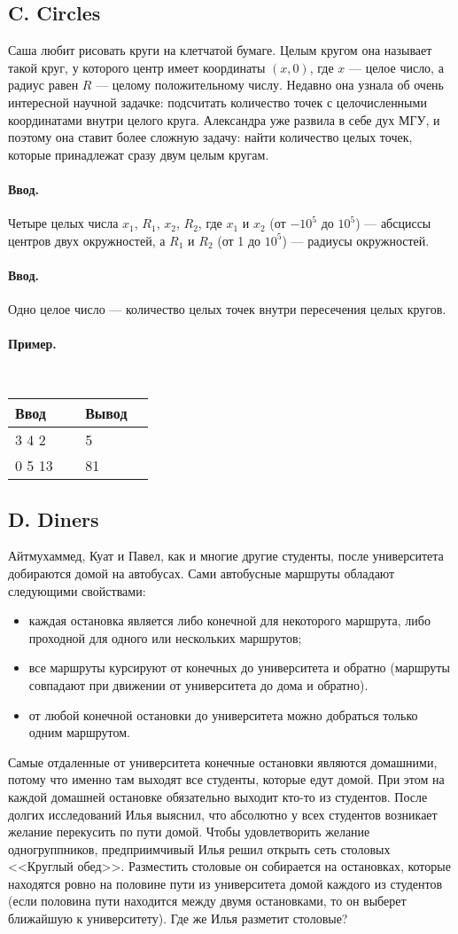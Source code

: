 \documentclass[12pt, a4paper]{article}
\newcommand{\informat}[1]
{
	\paragraph{Ввод.\\} #1
}
\newcommand{\examplee}[4]
{
	\paragraph{Пример.\\}
	{\tt
	\begin{tabular}{|p{0.4\linewidth}|p{0.4\linewidth}|}
	\hline
	Ввод 	& Вывод  	\\
	\hline
	#1 		& #2 		\\
	\hline
	#3		& #4		\\
	\hline
	\end{tabular}
	}
}
\begin{document}
\subsection*{C. Circles}

Саша любит рисовать круги на клетчатой бумаге. Целым кругом она называет такой круг, у которого центр имеет координаты $(x, 0)$, где $x$ --- целое число, а радиус равен $R$ --- целому положительному числу. Недавно она узнала об очень интересной научной задачке: подсчитать количество точек с целочисленными координатами внутри целого круга. Александра уже развила в себе дух МГУ, и поэтому она ставит более сложную задачу: найти количество целых точек, которые принадлежат сразу двум целым кругам.

\informat{Четыре целых числа $x_1$, $R_1$, $x_2$, $R_2$, где $x_1$ и $x_2$ (от $-10^5$ до $10^5$) --- абсциссы центров двух окружностей, а $R_1$ и $R_2$ (от 1 до $10^5$) --- радиусы окружностей.}
 
\informat{Одно целое число --- количество целых точек внутри пересечения целых кругов.}
 
\examplee{3 4 \newline -1 2}{5}{0 5 \newline 0 13}{81}
  
\subsection*{D. Diners}

Айтмухаммед, Куат и Павел, как и многие другие студенты, после университета добираются домой на автобусах. Сами автобусные маршруты обладают следующими свойствами: 
\begin{itemize}
\item каждая остановка является либо конечной для некоторого маршрута, либо проходной для одного или нескольких маршрутов;
\item все маршруты курсируют от конечных до университета и обратно (маршруты совпадают при движении от университета до дома и обратно).
\item от любой конечной остановки до университета можно добраться только одним маршрутом.
\end{itemize}
Самые отдаленные от университета конечные остановки являются домашними, потому что именно там выходят все студенты, которые едут домой. При этом на каждой домашней остановке обязательно выходит кто-то из студентов. После долгих исследований Илья выяснил, что абсолютно у всех студентов возникает желание перекусить по пути домой. Чтобы удовлетворить желание одногруппников, предприимчивый Илья решил открыть сеть столовых <<Круглый обед>>. Разместить столовые он собирается на остановках, которые находятся ровно на половине пути из университета домой каждого из студентов (если половина пути находится между двумя остановками, то он выберет ближайшую к университету). Где же Илья разметит столовые?
 
\end{document}
